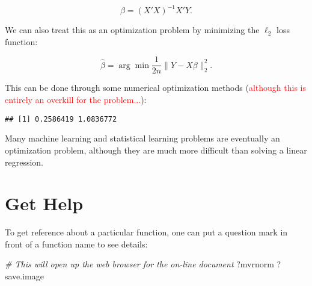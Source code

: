 \documentclass[
]{article}
\newenvironment{Shaded}{\begin{snugshade}}{\end{snugshade}}
\newcommand{\CommentTok}[1]{\textcolor[rgb]{0.56,0.35,0.01}{\textit{#1}}}
\newcommand{\ControlFlowTok}[1]{\textcolor[rgb]{0.13,0.29,0.53}{\textbf{#1}}}
\newcommand{\DataTypeTok}[1]{\textcolor[rgb]{0.13,0.29,0.53}{#1}}
\newcommand{\DecValTok}[1]{\textcolor[rgb]{0.00,0.00,0.81}{#1}}
\newcommand{\FloatTok}[1]{\textcolor[rgb]{0.00,0.00,0.81}{#1}}
\newcommand{\KeywordTok}[1]{\textcolor[rgb]{0.13,0.29,0.53}{\textbf{#1}}}
\newcommand{\NormalTok}[1]{#1}
\newcommand{\OperatorTok}[1]{\textcolor[rgb]{0.81,0.36,0.00}{\textbf{#1}}}
\newcommand{\StringTok}[1]{\textcolor[rgb]{0.31,0.60,0.02}{#1}}
\begin{document}
\[\widehat \beta = (X'X)^{-1} X'Y.\]

We can also treat this as an optimization problem by minimizing the
\(\ell_2\) loss function:

\[\widehat \beta = \arg\min \frac{1}{2n}\lVert Y - X\beta \rVert_2^2.\]

This can be done through some numerical optimization methods
(\textcolor{red}{although this is entirely an overkill for the problem...}):

\begin{Shaded}
\end{Shaded}

\begin{verbatim}
## [1] 0.2586419 1.0836772
\end{verbatim}

Many machine learning and statistical learning problems are eventually
an optimization problem, although they are much more difficult than
solving a linear regression.

\hypertarget{get-help}{%
\section{Get Help}\label{get-help}}

To get reference about a particular function, one can put a question
mark in front of a function name to see details:

\begin{Shaded}
\begin{Highlighting}[]
    \CommentTok{# This will open up the web browser for the on-line document }
\NormalTok{    ?mvrnorm}
\NormalTok{    ?save.image}
\end{Highlighting}
\end{Shaded}
\end{document}
